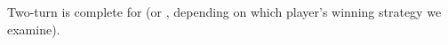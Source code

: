 \begin{conjecture}
  Two-turn  is complete for  (or , depending on
  which player's winning strategy we examine).
\end{conjecture}










%
%
%
%
%
%
%
%
%
%
%
%
%
